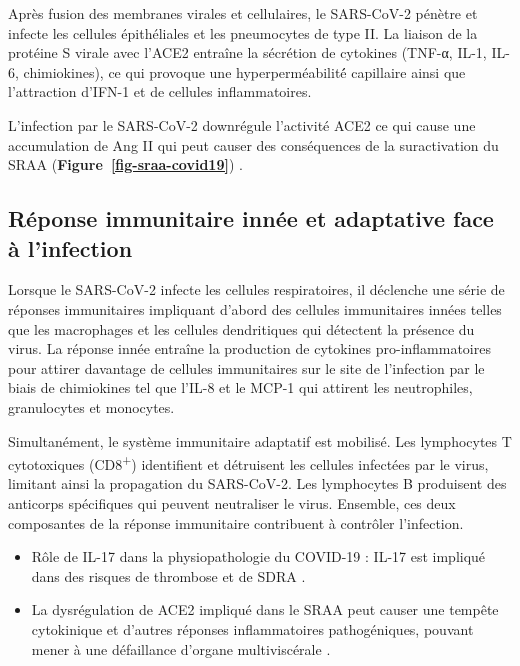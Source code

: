 \documentclass[
  a4paper,
  DIV=11,
  numbers=noendperiod,
  listof=totoc]{scrreprt}
\providecommand{\tightlist}{%
  \setlength{\itemsep}{0pt}\setlength{\parskip}{0pt}}\usepackage{longtable,booktabs,array}
\begin{document}
Après fusion des membranes virales et cellulaires, le SARS-CoV-2 pénètre
et infecte les cellules épithéliales et les pneumocytes de type II. La
liaison de la protéine S virale avec l'\ac{ACE2} entraîne la sécrétion
de cytokines (TNF-α, IL-1, IL-6, chimiokines), ce qui provoque une
hyperperméabilité́ capillaire ainsi que l'attraction d'\ac{IFN-1} et de
cellules inflammatoires.

L'infection par le SARS-CoV-2 downrégule l'activité ACE2 ce qui cause
une accumulation de Ang II qui peut causer des conséquences de la
suractivation du SRAA (\textbf{Figure~\ref{fig-sraa-covid19}})
\autocite{Mahdavi.2020}.

\subsection{Réponse immunitaire innée et adaptative face à
l'infection}\label{ruxe9ponse-immunitaire-innuxe9e-et-adaptative-face-uxe0-linfection}

Lorsque le SARS-CoV-2 infecte les cellules respiratoires, il déclenche
une série de réponses immunitaires impliquant d'abord des cellules
immunitaires innées telles que les macrophages et les cellules
dendritiques qui détectent la présence du virus. La réponse innée
entraîne la production de cytokines pro-inflammatoires pour attirer
davantage de cellules immunitaires sur le site de l'infection par le
biais de chimiokines tel que l'\ac{IL-8} et le MCP-1 qui attirent les
neutrophiles, granulocytes et monocytes.

Simultanément, le système immunitaire adaptatif est mobilisé. Les
lymphocytes T cytotoxiques (CD8\textsuperscript{+}) identifient et
détruisent les cellules infectées par le virus, limitant ainsi la
propagation du \ac{SARS-CoV-2}. Les lymphocytes B produisent des
anticorps spécifiques qui peuvent neutraliser le virus. Ensemble, ces
deux composantes de la réponse immunitaire contribuent à contrôler
l'infection.

\begin{itemize}
\tightlist
\item
  Rôle de IL-17 dans la physiopathologie du COVID-19 : IL-17 est
  impliqué dans des risques de thrombose et de \ac{SDRA}
  \autocite{Pal.2022}.
\item
  La dysrégulation de ACE2 impliqué dans le SRAA peut causer une tempête
  cytokinique et d'autres réponses inflammatoires pathogéniques, pouvant
  mener à une défaillance d'organe multiviscérale
  \autocite{Argano.2023}.
\end{itemize}
\end{document}
